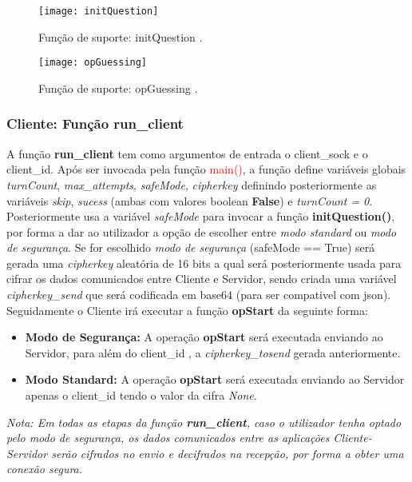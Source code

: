 \begin{figure}[H]
	\centering
	\texttt{[image: initQuestion]}
	\caption{Função de suporte: initQuestion .\\}
	\label{fig:initQuestion}
\end{figure} 
\begin{figure}[H]
	\centering
	\texttt{[image: opGuessing]}
	\caption{Função de suporte: opGuessing .\\}
	\label{fig:opGuessing}
\end{figure} 

\subsubsection{Cliente: Função run\_client}
A função \textbf{run\_client} tem como argumentos de entrada o client\_sock e o client\_id. Após ser invocada pela função \textcolor{red}{main()}, a função define variáveis globais \textsl{turnCount}, \textsl{max\_attempts}, \textsl{safeMode}, \textsl{cipherkey} definindo posteriormente as variáveis \textit{skip}, \textit{sucess} (ambas com valores boolean \textbf{False}) e \textit{turnCount = 0}. \\
Posteriormente usa a variável \textsl{safeMode} para invocar a função \textbf{initQuestion()}, por forma a dar ao utilizador a opção de escolher entre \textit{modo standard} ou \textit{modo de segurança}. Se for escolhido \textit{modo de segurança} (safeMode == True) será gerada uma \textsl{cipherkey} aleatória de 16 bits a qual será posteriormente usada para cifrar os dados comunicados entre Cliente e Servidor, sendo criada uma variável \textsl{cipherkey\_send} que será codificada em base64 (para ser compativel com \ac{json}).
	Seguidamente o Cliente irá executar a função \textbf{opStart} da seguinte forma:

	\begin{itemize}		
			\item\textbf{Modo de Segurança:} A operação \textbf{opStart} será executada enviando ao Servidor, para além do client\_id , a \textit{cipherkey\_tosend} gerada anteriormente. 
			\item\textbf{Modo Standard:} A operação \textbf{opStart} será executada enviando ao Servidor apenas o client\_id tendo o valor da cifra \textit{None}.
	\end{itemize}
	
	\textsl{Nota: Em todas as etapas da função \textbf{run\_client}, caso o utilizador tenha optado pelo \textit{modo de segurança}, os dados comunicados entre as aplicações Cliente-Servidor serão cifrados no envio e decifrados na recepção, por forma a obter uma conexão segura.}

